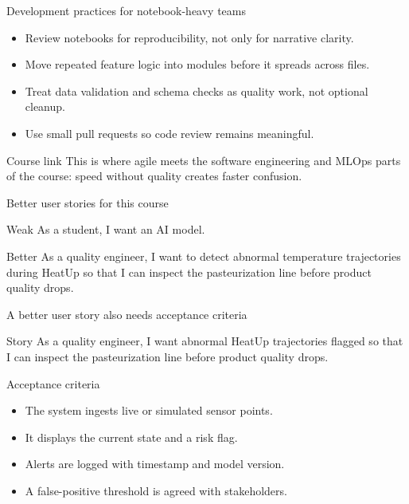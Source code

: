 \begin{frame}{Development practices for notebook-heavy teams}
\begin{itemize}
\item Review notebooks for reproducibility, not only for narrative clarity.
\item Move repeated feature logic into modules before it spreads across files.
\item Treat data validation and schema checks as quality work, not optional cleanup.
\item Use small pull requests so code review remains meaningful.
\end{itemize}
\begin{block}{Course link}
This is where agile meets the software engineering and MLOps parts of the course: speed without quality creates faster confusion.
\end{block}
\coursefooter
\end{frame}

\begin{frame}{Better user stories for this course}
\begin{block}{Weak}
As a student, I want an AI model.
\end{block}
\begin{block}{Better}
As a quality engineer, I want to detect abnormal temperature trajectories during HeatUp so that I can inspect the pasteurization line before product quality drops.
\end{block}
\coursefooter
\end{frame}

\begin{frame}{A better user story also needs acceptance criteria}
\begin{block}{Story}
As a quality engineer, I want abnormal HeatUp trajectories flagged so that I can inspect the pasteurization line before product quality drops.
\end{block}
\begin{block}{Acceptance criteria}
\begin{itemize}
\item The system ingests live or simulated sensor points.
\item It displays the current state and a risk flag.
\item Alerts are logged with timestamp and model version.
\item A false-positive threshold is agreed with stakeholders.
\end{itemize}
\end{block}
\coursefooter
\end{frame}

